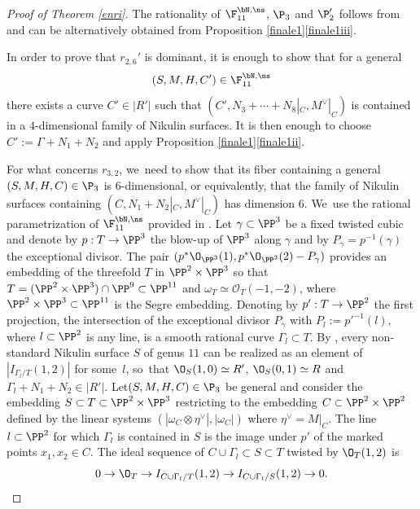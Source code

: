 \begin{proof}[Proof of Theorem \ref{enri}]
The rationality of $\F_{11}^{\bN,\ns}$, $\P_{3}$ and $\P'_{2}$ follows from \cite[Th.\,1.2]{KLV2} and can be alternatively obtained from Proposition \ref{finale1}\eqref{finale1iii}.

In order to prove that $r_{2,6}'$ is dominant, it is enough to show that for a general\vspace*{-3pt}
\[
(S,M,H,C')\in \F_{11}^{\bN,\ns}
\]
there exists a curve $C'\in |R'|$ such that $(C',N_3+\cdots+N_8|_C,M^\vee|_C)$ is contained in a $4$-dimensional family of Nikulin surfaces. It is then enough to choose $C':=\Gamma+N_1+N_2$ and apply Proposition \ref{finale1}\eqref{finale1ii}.

\Changel

For what concerns $r_{3,2}$, we~need to show that its fiber containing a general $(S,M,H,C)\in \P_{3}$ is $6$-dimensional, or equivalently, that the family of Nikulin surfaces containing $(C,N_1+N_2|_C,M^\vee|_C)$ has dimension $6$. We~use the rational parametrization of $\F_{11}^{\bN,\ns}$ provided in \cite[\S 5]{KLV2}. Let $\gamma\subset \PP^3$ be a fixed twisted cubic and denote by \hbox{$p:T\to \PP^3$} the blow-up of $\PP^3$ along $\gamma$ and by $P_\gamma=p^{-1}(\gamma)$ the exceptional divisor. The pair $(p^*\O_{\PP^3}(1), p^*\O_{\PP^3}(2)-P_\gamma)$ provides an embedding of the threefold $T$ in $\PP^2\times \PP^3$ so that $T=(\PP^2\times \PP^3)\cap \PP^9\subset \PP^{11}$ and $\omega_T\simeq \mathcal O_T(-1,-2)$, where $\PP^2\times \PP^3\subset\PP^{11}$ is the Segre embedding. Denoting by $p':T\to \PP^2$ the first projection, the intersection of the exceptional divisor $P_\gamma$ with $P_l:=p'^{-1}(l)$, where $l\subset\PP^2$ is any line, is a smooth rational curve $\Gamma_l\subset T$. By \cite[Lem.\,5.3]{KLV2}, every non-standard Nikulin surface $S$ of genus $11$ can be realized as an element of $|I_{\Gamma_l/T}(1,2)|$ for some~$l$, so~that $\O_S(1,0)\simeq R'$, $\O_S(0,1)\simeq R$ and $\Gamma_l+N_1+N_2\in |R'|$. Let$(S,M,H,C)\in \P_{3}$ be general and consider the embedding $ S\subset T\subset \PP^2\times \PP^3$ restricting to the embedding $C\subset \PP^2\times \PP^2$ defined by the linear systems $(|\omega_C\otimes \eta^\vee|, |\omega_C|)$ where $\eta^\vee=M|_C$. The line $l\subset \PP^2$ for which $\Gamma_l$ is contained in $S$ is the image under $p'$ of the marked points $x_1,x_2\in C$. The ideal sequence of $C\cup\Gamma_l\subset S\subset T$ twisted by $\O_T(1,2)$ is\vspace*{-3pt}
\[
0\to \O_T\to I_{C\cup \Gamma_l/T}(1,2)\to I_{C\cup \Gamma_l/S}(1,2)\to 0.
\]
\end{proof}
